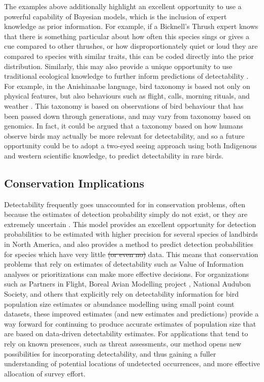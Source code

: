 \documentclass[12pt]{article}
\makeatletter
\providecommand{\DIFdel}[1]{{\protect\color{red}\sout{#1}}} %
\providecommand{\DIFdelbegin}{} %
\providecommand{\DIFdelend}{} %
\newcommand{\DIFscaledelfig}{0.5}
\newlength{\DIFdelgraphicswidth} %
\newlength{\DIFdelgraphicsheight} %
\newcommand{\DIFdelincludegraphics}[2][]{%
\sbox{\DIFdelgraphicsbox}{\DIFOincludegraphics[#1]{#2}}%
\settoboxwidth{\DIFdelgraphicswidth}{\DIFdelgraphicsbox} %
\settoboxtotalheight{\DIFdelgraphicsheight}{\DIFdelgraphicsbox} %
\scalebox{\DIFscaledelfig}{%
\parbox[b]{\DIFdelgraphicswidth}{\usebox{\DIFdelgraphicsbox}\\[-\baselineskip] \rule{\DIFdelgraphicswidth}{0em}}\llap{\resizebox{\DIFdelgraphicswidth}{\DIFdelgraphicsheight}{%
\setlength{\unitlength}{\DIFdelgraphicswidth}%
\begin{picture}(1,1)%
\thicklines\linethickness{2pt} %
{\color[rgb]{1,0,0}\put(0,0){\framebox(1,1){}}}%
{\color[rgb]{1,0,0}\put(0,0){\line( 1,1){1}}}%
{\color[rgb]{1,0,0}\put(0,1){\line(1,-1){1}}}%
\end{picture}%
}\hspace*{3pt}}} %
} %
\DeclareRobustCommand{\DIFdelbegin}{\DIFOdelbegin \let\includegraphics\DIFdelincludegraphics} %
\DeclareRobustCommand{\DIFdelend}{\DIFOaddend \let\includegraphics\DIFOincludegraphics} %
\let\sout@orig\sout %
\renewcommand{\sout}[1]{\ifmmode\text{\sout@orig{\ensuremath{#1}}}\else\sout@orig{#1}\fi} %
\makeatother
\begin{document}
\par The examples above additionally highlight an excellent opportunity to use a powerful capability of Bayesian models, which is the inclusion of expert knowledge as prior information. 
For example, if a Bicknell’s Thrush expert knows that there is something particular about how often this species sings or gives a cue compared to other thrushes, or how disproportionately quiet or loud they are compared to species with similar traits, this can be coded directly into the prior distribution.
Similarly, this may also provide a unique opportunity to use traditional ecological knowledge to further inform predictions of detectability \citep{wardfear_sharper_2019}.
For example, in the Anishinaabe language, bird taxonomy is based not only on physical features, but also behaviours such as flight, calls, morning rituals, and weather \citep{pitawanakwat_evening_2022}.
This taxonomy is based on observations of bird behaviour that has been passed down through generations, and may vary from taxonomy based on genomics.
In fact, it could be argued that a taxonomy based on how humans observe birds may actually be more relevant for detectability, and so a future opportunity could be to adopt a two-eyed seeing approach \cite{reid_twoeyed_2021} using both Indigenous and western scientific knowledge, to predict detectability in rare birds.

\subsection{Conservation Implications}
\par Detectability frequently goes unaccounted for in conservation problems, often because the estimates of detection probability simply do not exist, or they are extremely uncertain \citep{bennett_how_2024}.
This model provides an excellent opportunity for detection probabilities to be estimated with higher precision for several species of landbirds in North America, and also provides a method to predict detection probabilities for species which have very little \DIFdelbegin \DIFdel{(or even no) }\DIFdelend data. 
This means that conservation problems that rely on estimates of detectability such as Value of Information analyses \citep{canessa_when_2015, bennett_when_2018} or prioritizations \citep{hanson_prioritizr_2022} can make more effective decisions.
For organizations such as Partners in Flight, Boreal Avian Modelling project \citep{cumming_toward_2010}, National Audubon Society, and others that explicitly rely on detectability information for bird population size estimates or abundance modelling using small point count datasets, these improved estimates (and new estimates and predictions) provide a way forward for continuing to produce accurate estimates of population size that are based on data-driven detectability estimates.
For applications that tend to rely on known presences, such as threat assessments, our method opens new possibilities for incorporating detectability, and thus gaining a fuller understanding of  potential locations of undetected occurrences, and more effective allocation of survey effort.
\end{document}
